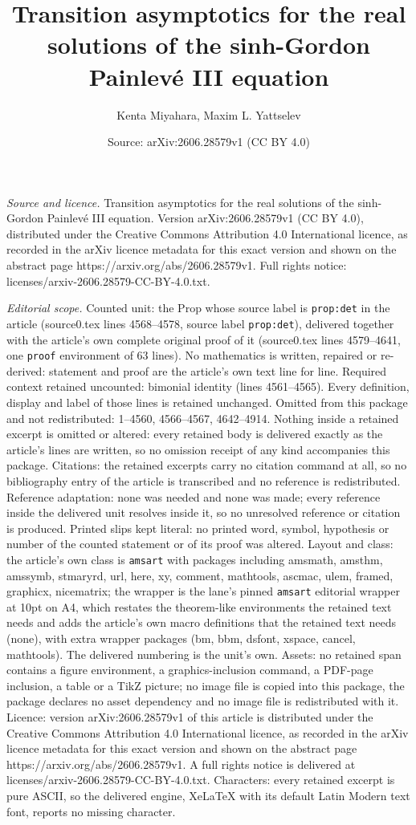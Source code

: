 \documentclass[10pt,a4paper]{amsart}
\title[Transition asymptotics for the real solutions of the sinh-Go]{Transition asymptotics for the real solutions of the sinh-Gordon Painlev\'e III equation}
\author{Kenta Miyahara, Maxim L. Yattselev}
\date{Source: arXiv:2606.28579v1 (CC BY 4.0)}
\begin{document}
\maketitle

\noindent\emph{Source and licence.} Transition asymptotics for the real solutions of the sinh-Gordon Painlev\'e III equation. Version arXiv:2606.28579v1 (CC BY 4.0), distributed under the Creative Commons Attribution 4.0 International licence, as recorded in the arXiv licence metadata for this exact version and shown on the abstract page https://arxiv.org/abs/2606.28579v1. Full rights notice: licenses/arxiv-2606.28579-CC-BY-4.0.txt.\par\smallskip

\noindent\textit{Editorial scope.} Counted unit: the Prop whose source label is \texttt{prop:det} in the article (source0.tex lines 4568--4578, source label \texttt{prop:det}), delivered together with the article's own complete original proof of it (source0.tex lines 4579--4641, one \texttt{proof} environment of 63 lines). No mathematics is written, repaired or re-derived: statement and proof are the article's own text line for line. Required context retained uncounted: bimonial identity (lines 4561--4565). Every definition, display and label of those lines is retained unchanged. Omitted from this package and not redistributed: 1--4560, 4566--4567, 4642--4914. Nothing inside a retained excerpt is omitted or altered: every retained body is delivered exactly as the article's lines are written, so no omission receipt of any kind accompanies this package. Citations: the retained excerpts carry no citation command at all, so no bibliography entry of the article is transcribed and no reference is redistributed. Reference adaptation: none was needed and none was made; every reference inside the delivered unit resolves inside it, so no unresolved reference or citation is produced. Printed slips kept literal: no printed word, symbol, hypothesis or number of the counted statement or of its proof was altered. Layout and class: the article's own class is \texttt{amsart} with packages including amsmath, amsthm, amssymb, stmaryrd, url, here, xy, comment, mathtools, ascmac, ulem, framed, graphicx, nicematrix; the wrapper is the lane's pinned \texttt{amsart} editorial wrapper at 10pt on A4, which restates the theorem-like environments the retained text needs and adds the article's own macro definitions that the retained text needs (none), with extra wrapper packages (bm, bbm, dsfont, xspace, cancel, mathtools). The delivered numbering is the unit's own. Assets: no retained span contains a figure environment, a graphics-inclusion command, a PDF-page inclusion, a table or a TikZ picture; no image file is copied into this package, the package declares no asset dependency and no image file is redistributed with it. Licence: version arXiv:2606.28579v1 of this article is distributed under the Creative Commons Attribution 4.0 International licence, as recorded in the arXiv licence metadata for this exact version and shown on the abstract page https://arxiv.org/abs/2606.28579v1. A full rights notice is delivered at licenses/arxiv-2606.28579-CC-BY-4.0.txt. Characters: every retained excerpt is pure ASCII, so the delivered engine, XeLaTeX with its default Latin Modern text font, reports no missing character.
\end{document}

